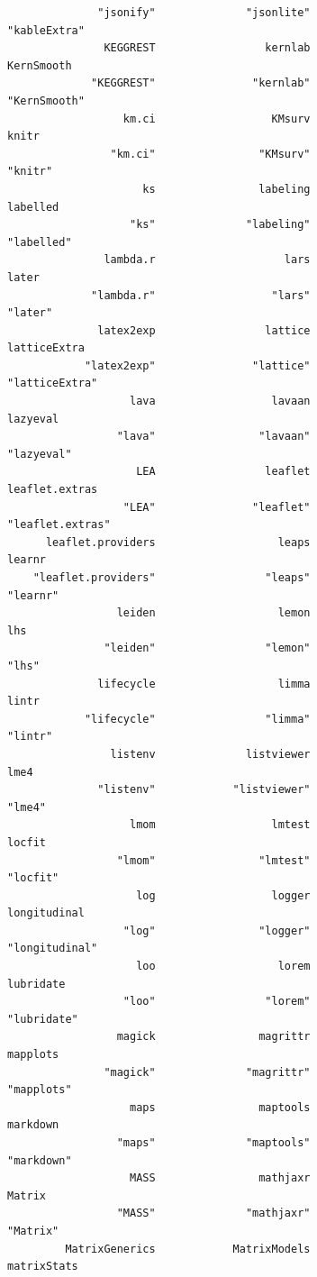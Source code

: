 \documentclass[
  letterpaper,
  DIV=11,
  numbers=noendperiod]{scrreprt}
\begin{document}
\begin{verbatim}
              "jsonify"              "jsonlite"            "kableExtra" 
               KEGGREST                 kernlab              KernSmooth 
             "KEGGREST"               "kernlab"            "KernSmooth" 
                  km.ci                  KMsurv                   knitr 
                "km.ci"                "KMsurv"                 "knitr" 
                     ks                labeling                labelled 
                   "ks"              "labeling"              "labelled" 
               lambda.r                    lars                   later 
             "lambda.r"                  "lars"                 "later" 
              latex2exp                 lattice            latticeExtra 
            "latex2exp"               "lattice"          "latticeExtra" 
                   lava                  lavaan                lazyeval 
                 "lava"                "lavaan"              "lazyeval" 
                    LEA                 leaflet          leaflet.extras 
                  "LEA"               "leaflet"        "leaflet.extras" 
      leaflet.providers                   leaps                  learnr 
    "leaflet.providers"                 "leaps"                "learnr" 
                 leiden                   lemon                     lhs 
               "leiden"                 "lemon"                   "lhs" 
              lifecycle                   limma                   lintr 
            "lifecycle"                 "limma"                 "lintr" 
                listenv              listviewer                    lme4 
              "listenv"            "listviewer"                  "lme4" 
                   lmom                  lmtest                  locfit 
                 "lmom"                "lmtest"                "locfit" 
                    log                  logger            longitudinal 
                  "log"                "logger"          "longitudinal" 
                    loo                   lorem               lubridate 
                  "loo"                 "lorem"             "lubridate" 
                 magick                magrittr                mapplots 
               "magick"              "magrittr"              "mapplots" 
                   maps                maptools                markdown 
                 "maps"              "maptools"              "markdown" 
                   MASS                mathjaxr                  Matrix 
                 "MASS"              "mathjaxr"                "Matrix" 
         MatrixGenerics            MatrixModels             matrixStats 

\end{verbatim}
\end{document}
